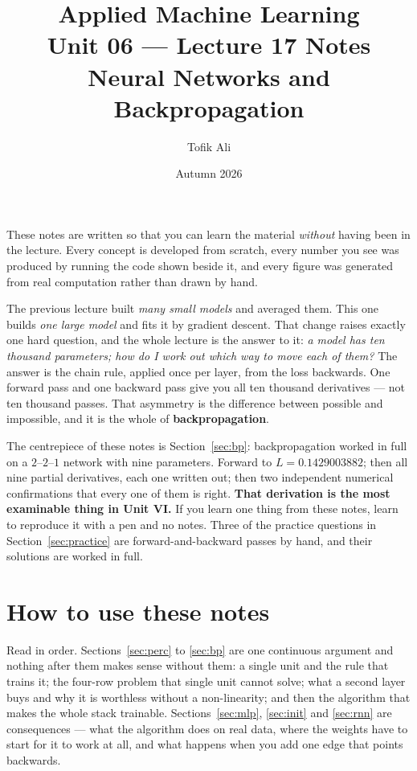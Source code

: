 \documentclass[11pt]{article}
\title{Applied Machine Learning\\Unit 06 --- Lecture 17 Notes\\
       Neural Networks and Backpropagation}
\author{Tofik Ali}
\date{Autumn 2026}
\begin{document}
\maketitle

\begin{keyidea}
These notes are written so that you can learn the material \emph{without}
having been in the lecture. Every concept is developed from scratch, every
number you see was produced by running the code shown beside it, and every
figure was generated from real computation rather than drawn by hand.

The previous lecture built \emph{many small models} and averaged them. This
one builds \emph{one large model} and fits it by gradient descent. That change
raises exactly one hard question, and the whole lecture is the answer to it:
\emph{a model has ten thousand parameters; how do I work out which way to move
each of them?} The answer is the chain rule, applied once per layer, from the
loss backwards. One forward pass and one backward pass give you all ten
thousand derivatives --- not ten thousand passes. That asymmetry is the
difference between possible and impossible, and it is the whole of
\textbf{backpropagation}.

The centrepiece of these notes is Section~\ref{sec:bp}: backpropagation worked
in full on a $2$--$2$--$1$ network with nine parameters. Forward to
$L = \mathbf{0.1429003882}$; then all nine partial derivatives, each one
written out; then two independent numerical confirmations that every one of
them is right. \textbf{That derivation is the most examinable thing in Unit
VI.} If you learn one thing from these notes, learn to reproduce it with a pen
and no notes. Three of the practice questions in Section~\ref{sec:practice}
are forward-and-backward passes by hand, and their solutions are worked in
full.
\end{keyidea}

\tableofcontents
\medskip

\section{How to use these notes}
\label{sec:how}

Read in order. Sections~\ref{sec:perc} to \ref{sec:bp} are one continuous
argument and nothing after them makes sense without them: a single unit and
the rule that trains it; the four-row problem that single unit cannot solve;
what a second layer buys and why it is worthless without a non-linearity; and
then the algorithm that makes the whole stack trainable.
Sections~\ref{sec:mlp}, \ref{sec:init} and \ref{sec:rnn} are consequences ---
what the algorithm does on real data, where the weights have to start for it
to work at all, and what happens when you add one edge that points backwards.
\end{document}
